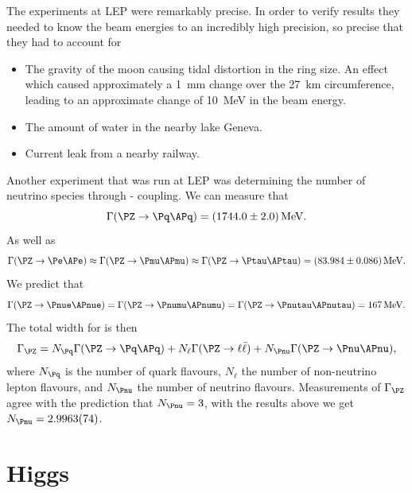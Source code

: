 \documentclass[fleqn]{NotesClass}
\begin{document}
    The experiments at LEP were remarkably precise.
    In order to verify results they needed to know the beam energies to an incredibly high precision, so precise that they had to account for
    \begin{itemize}
        \item The gravity of the moon causing tidal distortion in the ring size. An effect which caused approximately a \qty{1}{\milli\metre} change over the \qty{27}{\kilo\metre} circumference, leading to an approximate change of \qty{10}{\mega\electronvolt} in the beam energy.
        \item The amount of water in the nearby lake Geneva.
        \item Current leak from a nearby railway.
    \end{itemize}
    
    Another experiment that was run at LEP was determining the number of neutrino species through \PZ-\Pnu{} coupling.
    We can measure that
    \begin{equation}
        \Gamma(\PZ \to \Pq\APq) = \qty[uncertainty-mode=separate]{1744+-2.0}{\mega\electronvolt}.
    \end{equation} 
    As well as
    \begin{equation}
        \Gamma(\PZ \to \Pe\APe) \approx \Gamma(\PZ\to \Pmu\APmu) \approx \Gamma(\PZ \to \Ptau\APtau) = \qty[uncertainty-mode=separate]{83.984+-0.086}{\mega\electronvolt}.
    \end{equation}
    We predict that
    \begin{equation}
        \Gamma(\PZ \to \Pnue\APnue) = \Gamma(\PZ \to \Pnumu\APnumu) = \Gamma(\PZ \to \Pnutau\APnutau) = \qty{167}{\mega\electronvolt}.
    \end{equation}
    The total width for \PZ{} is then
    \begin{equation}
        \Gamma_{\PZ} = N_{\Pq}\Gamma(\PZ \to \Pq\APq) + N_\ell\Gamma(\PZ \to \ell\bar{\ell}) + N_{\Pnu}\Gamma(\PZ\to\Pnu\APnu),
    \end{equation}
    where \(N_{\Pq}\) is the number of quark flavours, \(N_{\ell}\) the number of non-neutrino lepton flavours, and \(N_{\Pnu}\) the number of neutrino flavours.
    Measurements of \(\Gamma_{\PZ}\) agree with the prediction that \(N_{\Pnu} = 3\), with the results above we get \(N_{\Pnu} = \num{2.9963 +- 0.0074}\).
    
    \part{Higgs}
\end{document}
